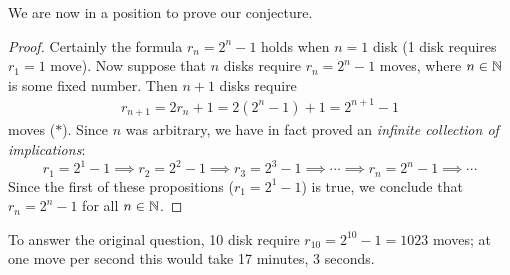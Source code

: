 \goodbreak

We are now in a position to prove our conjecture.

\begin{proof}
	Certainly the formula $r_n=2^n-1$ holds when $n=1$ disk (1 disk requires $r_1=1$ move).\smallbreak
	Now suppose that $n$ disks require $r_n=2^n-1$ moves, where $n\in\mathbb{N}$ is some fixed number. Then $n+1$ disks require
	\begin{align*}
		r_{n+1}=2r_n+1=2(2^n-1)+1 =2^{n+1}-1 %
	\end{align*}
	moves ($\ast$). Since $n$ was arbitrary, we have in fact proved an \emph{infinite collection of implications}: 
	\[
		r_1=2^1-1\implies r_2=2^2-1\implies r_3=2^3-1 \implies \cdots \implies r_n=2^n-1\implies \cdots
	\]
	Since the first of these propositions ($r_1=2^1-1$) is true, we conclude that $r_n=2^n-1$ for all $n\in\mathbb{N}$.
\end{proof}

To answer the original question, 10 disk require $r_{10}=2^{10}-1=1023$ moves; at one move per second this would take 17 minutes, 3 seconds.



% 


